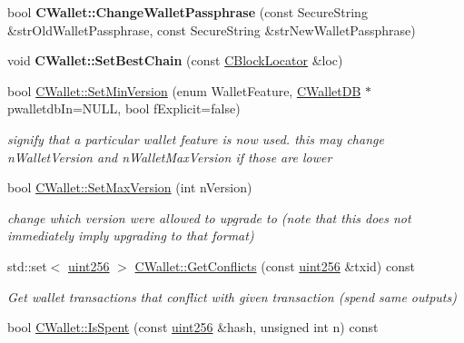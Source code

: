 \begin{DoxyCompactItemize}
bool {\bfseries C\+Wallet\+::\+Change\+Wallet\+Passphrase} (const Secure\+String \&str\+Old\+Wallet\+Passphrase, const Secure\+String \&str\+New\+Wallet\+Passphrase)
\item 
\mbox{\label{group__map_wallet_ga1697a92171b4359f49b38aed643cf92b}} 
void {\bfseries C\+Wallet\+::\+Set\+Best\+Chain} (const \mbox{\hyperlink{struct_c_block_locator}{C\+Block\+Locator}} \&loc)
\item 
\mbox{\label{group__map_wallet_gafa48a3ee3096681650c8b9589579e9cb}} 
bool \mbox{\hyperlink{group__map_wallet_gafa48a3ee3096681650c8b9589579e9cb}{C\+Wallet\+::\+Set\+Min\+Version}} (enum Wallet\+Feature, \mbox{\hyperlink{class_c_wallet_d_b}{C\+Wallet\+DB}} $\ast$pwalletdb\+In=N\+U\+LL, bool f\+Explicit=false)
\begin{DoxyCompactList}\small\item\em signify that a particular wallet feature is now used. this may change n\+Wallet\+Version and n\+Wallet\+Max\+Version if those are lower \end{DoxyCompactList}\item 
\mbox{\label{group__map_wallet_ga1bb7c19e7dd483f231f8077fb7fb942b}} 
bool \mbox{\hyperlink{group__map_wallet_ga1bb7c19e7dd483f231f8077fb7fb942b}{C\+Wallet\+::\+Set\+Max\+Version}} (int n\+Version)
\begin{DoxyCompactList}\small\item\em change which version we\textquotesingle{}re allowed to upgrade to (note that this does not immediately imply upgrading to that format) \end{DoxyCompactList}\item 
\mbox{\label{group__map_wallet_ga63ace949094f4f52d7ef1f9f321a24e7}} 
std\+::set$<$ \mbox{\hyperlink{classuint256}{uint256}} $>$ \mbox{\hyperlink{group__map_wallet_ga63ace949094f4f52d7ef1f9f321a24e7}{C\+Wallet\+::\+Get\+Conflicts}} (const \mbox{\hyperlink{classuint256}{uint256}} \&txid) const
\begin{DoxyCompactList}\small\item\em Get wallet transactions that conflict with given transaction (spend same outputs) \end{DoxyCompactList}\item 
bool \mbox{\hyperlink{group__map_wallet_ga6adcf1c224ed3c3fe4b0b19f6fca75d8}{C\+Wallet\+::\+Is\+Spent}} (const \mbox{\hyperlink{classuint256}{uint256}} \&hash, unsigned int n) const

\end{DoxyCompactItemize}

